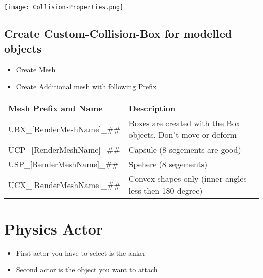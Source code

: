 \documentclass{scrbook}
\begin{document}
        \texttt{[image: Collision-Properties.png]} \\

        \section{Create Custom-Collision-Box for modelled objects}
            \begin{itemize}
                \item Create Mesh
                \item Create Additional mesh with following Prefix
            \end{itemize}
            \begin{table}[H]
                \begin{tabular}{|l|l|}
                    \hline
                    Mesh Prefix and Name & Description \\
                    \hline
                    UBX\_[RenderMeshName]\_\#\# & Boxes are created with the Box objects. Don't move or deform \\
                    UCP\_[RenderMeshName]\_\#\# & Capsule (8 segements are good) \\
                    USP\_[RenderMeshName]\_\#\# & Spehere (8 segements) \\
                    UCX\_[RenderMeshName]\_\#\# & Convex shapes only (inner angles less then 180 degree) \\
                    \hline
                \end{tabular}
            \end{table}
            

        


    \chapter{Physics Actor}
        \begin{itemize}
            \item First actor you have to select is the anker
            \item Second actor is the object you want to attach
        \end{itemize}






\end{document}
